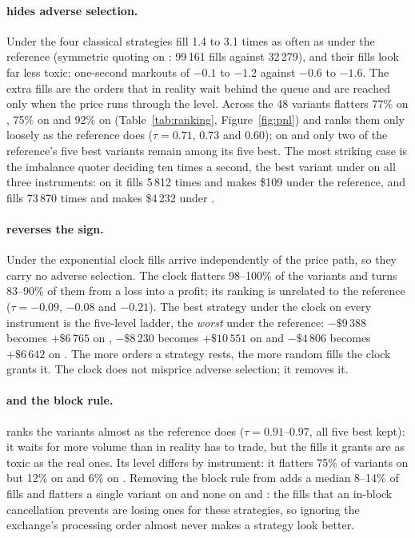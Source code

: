 \paragraph{\touch{} hides adverse selection.}
Under \touch{} the four classical strategies fill 1.4 to 3.1 times as often as
under the reference (symmetric quoting on \BTC: 99\,161 fills against 32\,279),
and their fills look far less toxic: one-second markouts of $-0.1$ to $-1.2$\bps{}
against $-0.6$ to $-1.6$. The extra fills are the orders that in reality wait
behind the queue and are reached only when the price runs through the level.
Across the 48 variants \touch{} flatters 77\% on \BTC, 75\% on \ETH{} and 92\% on
\SOL{} (Table~\ref{tab:ranking}, Figure~\ref{fig:pnl}) and ranks them only loosely
as the reference does ($\tau=0.71$, $0.73$ and $0.60$); on \BTC{} and \ETH{} only
two of the reference's five best variants remain among its five best. The most
striking case is the imbalance quoter deciding ten times a second, the best
variant under \touch{} on all three instruments: on \BTC{} it fills 5\,812 times and
makes \$109 under the reference, and fills 73\,870 times and makes \$4\,232 under
\touch.

\paragraph{\clock{} reverses the sign.}
Under the exponential clock fills arrive independently of the price path, so they
carry no adverse selection. The clock flatters 98--100\% of the variants and turns
83--90\% of them from a loss into a profit; its ranking is unrelated to the
reference ($\tau=-0.09$, $-0.08$ and $-0.21$). The best strategy under the clock on
every instrument is the five-level ladder, the \emph{worst} under the reference:
$-\$9\,388$ becomes $+\$6\,765$ on \BTC, $-\$8\,230$ becomes $+\$10\,551$ on \ETH{}
and $-\$4\,806$ becomes $+\$6\,642$ on \SOL. The more orders a strategy rests, the
more random fills the clock grants it. The clock does not misprice adverse
selection; it removes it.

\paragraph{\vt{} and the block rule.}
\vt{} ranks the variants almost as the reference does ($\tau=0.91$--$0.97$, all
five best kept): it waits for more volume than in reality has to trade, but the
fills it grants are as toxic as the real ones. Its level differs by instrument:
it flatters 75\% of variants on \SOL{} but 12\% on \BTC{} and 6\% on \ETH. Removing
the block rule from \qa{} adds a median 8--14\% of fills and flatters a single
variant on \BTC{} and none on \ETH{} and \SOL: the fills that an in-block
cancellation prevents are losing ones for these strategies, so
ignoring the exchange's processing order almost never makes a strategy look
better.

